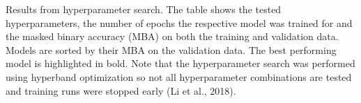 \documentclass[11pt]{article}
\begin{document}
\pagestyle{empty}
\begin{table}[h]
    \centering
    \caption{Results from hyperparameter search. The table shows the tested hyperparameters, the number of epochs the respective model was trained for and the masked binary accuracy (MBA) on both the training and validation data. Models are sorted by their MBA on the validation data. The best performing model is highlighted in bold. Note that the hyperparameter search was performed using hyperband optimization so not all hyperparameter combinations are tested and training runs were stopped early (Li et al., 2018).}
    \small
    
\end{table}
\end{document}
